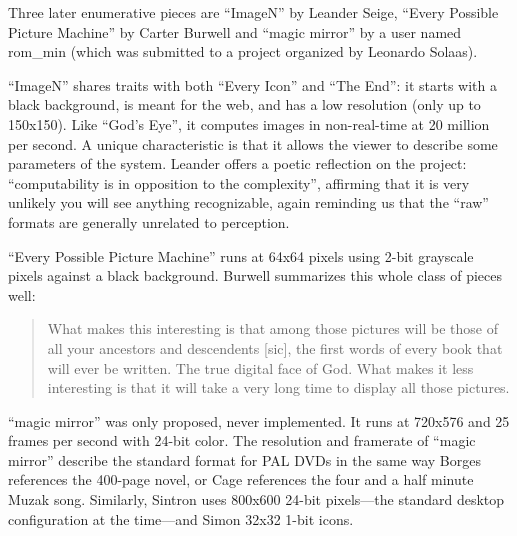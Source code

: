 \documentclass{thesis}
\begin{document}
Three later enumerative pieces are ``ImageN'' by Leander Seige\cite{leander_seige_imagen_????}, ``Every Possible Picture Machine'' by Carter Burwell\cite{carter_burwell_every_????} and ``magic mirror'' by a user named rom\_min\cite{leonardo_solaas_magic_????} (which was submitted to a project organized by Leonardo Solaas).
	
``ImageN'' shares traits with both ``Every Icon'' and ``The End'': it starts with a black background, is meant for the web, and has a low resolution (only up to 150x150). Like ``God's Eye'', it computes images in non-real-time at 20 million per second. A unique characteristic is that it allows the viewer to describe some parameters of the system. Leander offers a poetic reflection on the project: ``computability is in opposition to the complexity'', affirming that it is very unlikely you will see anything recognizable, again reminding us that the ``raw'' formats are generally unrelated to perception.
	
``Every Possible Picture Machine'' runs at 64x64 pixels using 2-bit grayscale pixels against a black background. Burwell summarizes this whole class of pieces well:
	
	\begin{quote}
	What makes this interesting is that among those pictures will be those of all your ancestors and descendents [sic], the first words of every book that will ever be written. The true digital face of God. What makes it less interesting is that it will take a very long time to display all those pictures.
	\end{quote}
	
``magic mirror'' was only proposed, never implemented. It runs at 720x576 and 25 frames per second with 24-bit color. The resolution and framerate of ``magic mirror'' describe the standard format for PAL DVDs in the same way Borges references the 400-page novel, or Cage references the four and a half minute Muzak song. Similarly, Sintron uses 800x600 24-bit pixels---the standard desktop configuration at the time---and Simon 32x32 1-bit icons.
	
\end{document}
